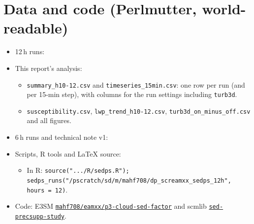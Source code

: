 \documentclass[10pt]{article}
\begin{document}
\section{Data and code (Perlmutter, world-readable)}
\begin{itemize}\small
\item 12\,h runs: 
\item This report's analysis: 
\begin{itemize}
\item \texttt{summary\_h10-12.csv} and \texttt{timeseries\_15min.csv}: one row per run (and per 15-min step), with columns for the run settings including \texttt{turb3d}.
\item \texttt{susceptibility.csv}, \texttt{lwp\_trend\_h10-12.csv}, \texttt{turb3d\_on\_minus\_off.csv} and all figures.
\end{itemize}
\item 6\,h runs and technical note v1: 
\item Scripts, R tools and LaTeX source: 
\begin{itemize}
\item In R: \texttt{source(".../R/sedps.R"); sedps\_runs("/pscratch/sd/m/mahf708/dp\_screamxx\_sedps\_12h", hours = 12)}.
\end{itemize}
\item Code: E3SM \href{https://github.com/mahf708/E3SM/tree/mahf708/eamxx/p3-cloud-sed-factor}{\texttt{mahf708/eamxx/p3-cloud-sed-factor}} and scmlib
\href{https://github.com/mahf708/scmlib/tree/sed-precsupp-study}{\texttt{sed-precsupp-study}}.
\end{itemize}
\end{document}

